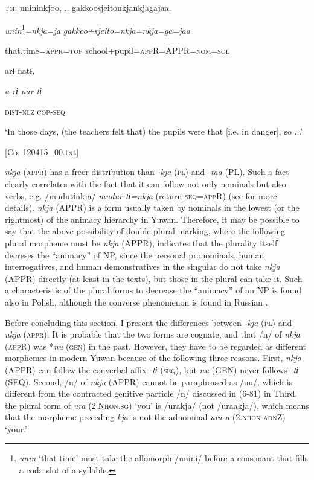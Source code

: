   \textsc{tm}:  unininkjoo, ..\textsubscript{} {\textbar}gakkoosjeito{\textbar}nkjankjagajaa.

    \textit{unin}\footnote{\textit{unin} ‘that time’ must take the allomorph /unini/ before a consonant that fills a coda slot of a syllable.}\textit{=nkja=ja}  \textit{gakkoo+sjeito=nkja=nkja=ga=jaa}

    that.time=\textsc{appr}=\textsc{top}  school+pupil=\textsc{app}R=APPR=\textsc{nom}=\textsc{sol}

    arɨ  natɨ,

    \textit{a-rɨ}  \textit{nar-tɨ}

    \textsc{dist}-\textsc{nlz}  \textsc{cop}-\textsc{seq}

    ‘In those days, (the teachers felt that) the pupils were that [i.e. in danger], so ...’

    [Co: 120415\_00.txt]

\textit{nkja} (\textsc{appr}) has a freer distribution than \textit{{}-kja} (\textsc{pl}) and \textit{{}-taa} (PL). Such a fact clearly correlates with the fact that it can follow not only nominals but also verbs, e.g. /mudutɨnkja/ \textit{mudur-tɨ=nkja} (return-\textsc{seq}=\textsc{app}R) (see for more details). \textit{nkja} (APPR) is a form usually taken by nominals in the lowest (or the rightmost) of the animacy hierarchy in Yuwan. Therefore, it may be possible to say that the above possibility of double plural marking, where the following plural morpheme must be \textit{nkja} (APPR), indicates that the plurality itself decreses the “animacy” of NP, since the personal pronominals, human interrogatives, and human demonstratives in the singular do not take \textit{nkja} (APPR) directly (at least in the texts), but those in the plural can take it. Such a characteristic of the plural forms to decrease the “animacy” of an NP is found also in Polish, although the converse phenomenon is found in Russian \citep[188]{Comrie1989}.

  Before concluding this section, I present the differences between \textit{{}-kja} (\textsc{pl}) and \textit{nkja} (\textsc{appr}). It is probable that the two forms are cognate, and that /n/ of \textit{nkja} (\textsc{app}R) was *\textit{nu} (\textsc{gen}) in the past. However, they have to be regarded as different morphemes in modern Yuwan because of the following three reasons. First, \textit{nkja} (APPR) can follow the converbal affix \textit{-tɨ} (\textsc{seq}), but \textit{nu} (GEN) never follows \textit{{}-tɨ} (SEQ). Second, /n/ of \textit{nkja} (APPR) cannot be paraphrased as /nu/, which is different from the contracted genitive particle /n/ discussed in (6-81) in  Third, the plural form of \textit{ura} (2.N\textsc{hon}.\textsc{sg}) ‘you’ is /urakja/ (not /uraakja/), which means that the morpheme preceding \textit{kja} is not the adnominal \textit{ura-a} (2.\textsc{nhon}-\textsc{adn}Z) ‘your.’

